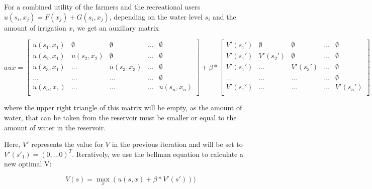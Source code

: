 \documentclass[12pt, a4paper, oneside]{article}
\begin{document}
For a combined utility of the farmers and the recreational users  $u(s_i,x_j) = F(x_j) + G(s_i,x_j)$, depending on the water level $s_i$ and the amount of irrigation $x_i$ we get an auxiliary matrix

\begin{dmath}
aux = \left[\begin{array}{ccccc} 
u(s_1, x_1)& \emptyset & \emptyset & ... & \emptyset \\ u(s_2, x_1)& u(s_2, x_2)& \emptyset & ... & \emptyset \\                                               u(s_3, x_1)& ... & u(s_3, x_3)& ... & \emptyset \\                                              ... & ... & ... & ... & \emptyset \\                                              u(s_n, x_1)& ... & ... & ... & u(s_n, x_n)\\                                               \end{array}\right]+\beta*\left[ \begin{array}{ccccc}
V'(s_1') & \emptyset & \emptyset & ... & \emptyset \\                                               V'(s_1') & V'(s_2') & \emptyset & ... & \emptyset \\                                               V'(s_1') & ... & V'(s_3') & ... & \emptyset \\                                              ... & ... & ... & ... & \emptyset \\                                              V'(s_1') & ... & ... & ... & V'(s_n') \\                                               \end{array}\right]
\end{dmath}

where the upper right triangle of this matrix will be empty, as the amount of water, that can be taken from the reservoir must be smaller or equal to the amount of water in the reservoir. 

Here, $V'$ represents the value for $V$ in the previous iteration and will be set to $V'(s'_1) = (0,...0)^T$. Iteratively, we use the bellman equation to calculate a new optimal V: 

\begin{equation}
V(s) = \max_{x}(u(s,x) + \beta*V'(s')))
\end{equation}
\label{eq:value-function}
\end{document}
